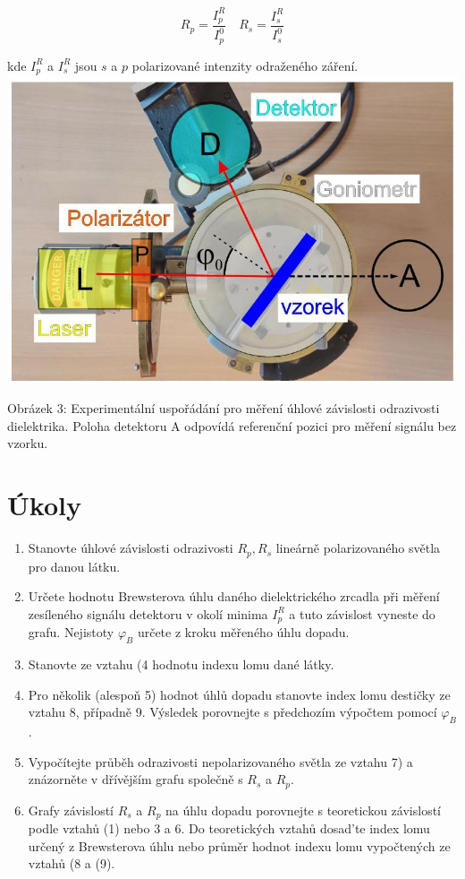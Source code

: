 \documentclass[czech,11pt,a4paper]{article}
\begin{document}
\begin{multicols}{2}
		\begin{equation}
			R_{p}=\frac{I_{p}^{R}}{I_{p}^{0}} \quad R_{s}=\frac{I_{s}^{R}}{I_{s}^{0}}
		\end{equation}
		
		kde $I_{p}^{R}$ a $I_{s}^{R}$ jsou $s$ a $p$ polarizované intenzity odraženého záření.
		\includegraphics[max width=0.9\linewidth, center]{2024_11_19_160a1389244899f42734g-4}
		
		Obrázek 3: Experimentální uspořádání pro měření úhlové závislosti odrazivosti dielektrika. Poloha detektoru A odpovídá referenční pozici pro měření signálu bez vzorku.
		
		\section*{Úkoly}
		\begin{enumerate}
			\item Stanovte úhlové závislosti odrazivosti $R_{p}, R_{s}$ lineárně polarizovaného světla pro danou látku.
			\item Určete hodnotu Brewsterova úhlu daného dielektrického zrcadla při měření zesíleného signálu detektoru v okolí minima $I_{p}^{R}$ a tuto závislost vyneste do grafu. Nejistoty $\varphi_{B}$ určete z kroku měřeného úhlu dopadu.
			\item Stanovte ze vztahu (4 hodnotu indexu lomu dané látky.
			\item Pro několik (alespoň 5) hodnot úhlů dopadu stanovte index lomu destičky ze vztahu 8, případně 9. Výsledek porovnejte s předchozím výpočtem pomocí $\varphi_{B}$.
			\item Vypočítejte průběh odrazivosti nepolarizovaného světla ze vztahu 7) a znázorněte v dřívějším grafu společně s $R_{s}$ a $R_{p}$.
			\item Grafy závislostí $R_{s}$ a $R_{p}$ na úhlu dopadu porovnejte s teoretickou závislostí podle vztahů (1) nebo 3 a 6. Do teoretických vztahů dosad’te index lomu určený z Brewsterova úhlu nebo průměr hodnot indexu lomu vypočtených ze vztahů (8 a (9).
		\end{enumerate}
		

\end{multicols}
\end{document}
